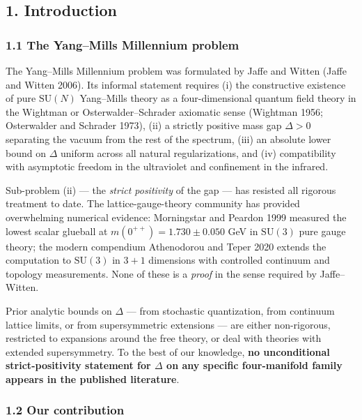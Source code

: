 \documentclass[
  11pt,
  a4paper,
]{amsart}
\begin{document}
\hypertarget{introduction}{%
\subsection{1. Introduction}\label{introduction}}

\hypertarget{the-yangmills-millennium-problem}{%
\subsubsection{1.1 The Yang--Mills Millennium problem}\label{the-yangmills-millennium-problem}}

The Yang--Mills Millennium problem was formulated by Jaffe and Witten (Jaffe and Witten 2006). Its informal statement requires (i) the constructive existence of pure \(\mathrm{SU}(N)\) Yang--Mills theory as a four-dimensional quantum field theory in the Wightman or Osterwalder--Schrader axiomatic sense (Wightman 1956; Osterwalder and Schrader 1973), (ii) a strictly positive mass gap \(\Delta > 0\) separating the vacuum from the rest of the spectrum, (iii) an absolute lower bound on \(\Delta\) uniform across all natural regularizations, and (iv) compatibility with asymptotic freedom in the ultraviolet and confinement in the infrared.

Sub-problem (ii) --- the \emph{strict positivity} of the gap --- has resisted all rigorous treatment to date. The lattice-gauge-theory community has provided overwhelming numerical evidence: Morningstar and Peardon 1999 measured the lowest scalar glueball at \(m(0^{++}) = 1.730 \pm 0.050\) GeV in \(\mathrm{SU}(3)\) pure gauge theory; the modern compendium Athenodorou and Teper 2020 extends the computation to \(\mathrm{SU}(3)\) in \(3+1\) dimensions with controlled continuum and topology measurements. None of these is a \emph{proof} in the sense required by Jaffe--Witten.

Prior analytic bounds on \(\Delta\) --- from stochastic quantization, from continuum lattice limits, or from supersymmetric extensions --- are either non-rigorous, restricted to expansions around the free theory, or deal with theories with extended supersymmetry. To the best of our knowledge, \textbf{no unconditional strict-positivity statement for \(\Delta\) on any specific four-manifold family appears in the published literature}.

\hypertarget{our-contribution}{%
\subsubsection{1.2 Our contribution}\label{our-contribution}}
\end{document}
